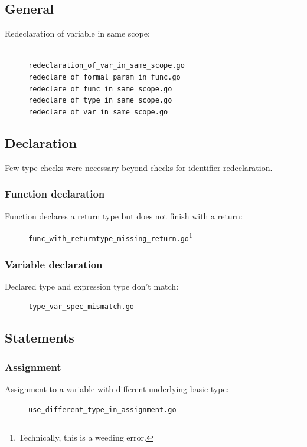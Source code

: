 \documentclass[oneside]{article}
\begin{document}
\subsection{General}

\begin{description}
  \item[Redeclaration of variable in same scope:]\ \\
    \verb|redeclaration_of_var_in_same_scope.go|\\
    \verb|redeclare_of_formal_param_in_func.go|\\
    \verb|redeclare_of_func_in_same_scope.go|\\
    \verb|redeclare_of_type_in_same_scope.go|\\
    \verb|redeclare_of_var_in_same_scope.go|
\end{description}

\subsection{Declaration}

Few type checks were necessary beyond checks for identifier redeclaration.

\subsubsection{Function declaration}
\begin{description}
  \item[Function declares a return type but does not finish with a return:] \verb|func_with_returntype_missing_return.go|\footnote{Technically, this is a weeding error.}
\end{description}

\subsubsection{Variable declaration}
\begin{description}
  \item[Declared type and expression type don't match:] \verb|type_var_spec_mismatch.go|
\end{description}

\subsection{Statements}

\subsubsection{Assignment}
\begin{description}
  \item[Assignment to a variable with different underlying basic type:] \verb|use_different_type_in_assignment.go|
\end{description}
\end{document}
